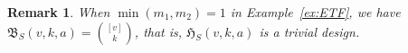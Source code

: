 \documentclass[11pt]{article}
\newtheorem{theorem}{Theorem}[section]
\newtheorem{remark}[theorem]{Remark}
\begin{document}

\begin{remark}
    When $\min(m_1,m_2)=1$ in Example~\ref{ex:ETF}, we have
    $\mathfrak B_{S}(v,k,a)=\binom{[v]}{k}$, that is, 
    $\mathfrak H_{S}(v,k,a)$ is a trivial design. 
\end{remark}
\end{document}
